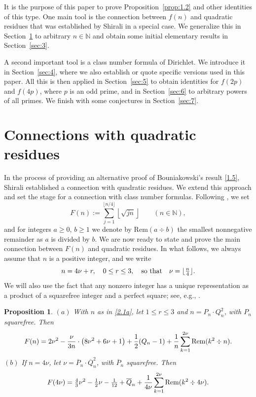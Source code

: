 \documentclass{amsart}
\theoremstyle{plain}
\newtheorem{proposition}[theorem]{Proposition}
\numberwithin{equation}{section}
\begin{document}
It is the purpose of this paper to prove Proposition~\ref{prop:1.2} and other
identities of this type. One main tool is the connection between $f(n)$
and quadratic residues that was established by Shirali \cite{Sh} in a special
case. We generalize this in Section~\ref{sec:2} to arbitrary $n\in{\mathbb N}$
and obtain some initial elementary results in Section~\ref{sec:3}.

A second important tool is a class number formula of Dirichlet. We introduce
it in Section~\ref{sec:4}, where we also establish or quote specific
versions used in this paper. All this is then applied in Section~\ref{sec:5}
to obtain identities for $f(2p)$ and $f(4p)$, where $p$ is an odd prime, and
in Section~\ref{sec:6} to arbitrary powers of all primes. We finish with some
conjectures in Section~\ref{sec:7}.

\section{Connections with quadratic residues}\label{sec:2}

In the process of providing an alternative proof of Bouniakowski's result
\eqref{1.5}, Shirali \cite{Sh} established a connection with quadratic residues.
We extend this approach and set the stage for a connection with class
number formulas. Following \cite{Sh}, we set
\begin{equation}\label{2.1}
F(n):=\sum_{j=1}^{\lfloor{n/4}\rfloor}\left\lfloor{\sqrt{jn}}\right\rfloor
\qquad(n\in{\mathbb N}),
\end{equation}
and for integers $a\geq 0$, $b\geq 1$ we denote by Rem$(a\div b)$ the smallest 
nonnegative remainder as $a$ is divided by $b$. We are now ready to state and
prove the main connection between $F(n)$ and quadratic residues.
In what follows, we always assume that $n$ is a positive integer, and we write
\begin{equation}\label{2.1a}
n = 4\nu+r,\quad0\leq r\leq 3,\quad\hbox{so that}\quad
\textstyle{\nu=\lfloor\frac{n}{4}\rfloor.}
\end{equation}
We will also use the fact that any nonzero integer has a unique representation
as a product of a squarefree integer and a perfect square; see, e.g., 
\cite[p.~29]{NZM}.


\begin{proposition}\label{prop:2.1}
$(a)$ With $n$ as in \eqref{2.1a}, let $1\leq r\leq 3$ and $n=P_n\cdot Q_n^2$,
with $P_n$ squarefree. Then
\begin{equation}\label{2.2}
F(n)=2\nu^2-\frac{\nu}{3n}\cdot\left(8\nu^2+6\nu+1\right)+\frac{1}{2}(Q_n-1)
+\frac{1}{n}\sum_{k=1}^{2\nu}{\rm Rem}(k^2\div n).
\end{equation}
$(b)$ If $n=4\nu$, let $\nu=\overline{P}_n\cdot\overline{Q}_n^2$, with 
$\overline{P}_n$ squarefree. Then
\begin{equation}\label{2.3}
F(4\nu)=\tfrac{4}{3}\nu^2-\tfrac{1}{2}\nu-\tfrac{1}{12}+\overline{Q}_n
+\frac{1}{4\nu}\sum_{k=1}^{2\nu}{\rm Rem}(k^2\div 4\nu).
\end{equation}
\end{proposition}
\end{document}
